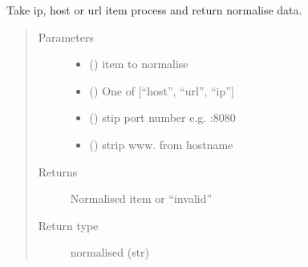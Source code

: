 \documentclass[letterpaper,10pt,english]{sphinxmanual}
\begin{document}

\begin{fulllineitems}
\label{\detokenize{utils:bloxone.utils.normalise}}
\sphinxAtStartPar
Take ip, host or url item process and
return normalise data.
\begin{quote}\begin{description}
\item[{Parameters}] \leavevmode\begin{itemize}
\item {} 
\sphinxAtStartPar
{} () \textendash{} item to normalise

\item {} 
\sphinxAtStartPar
{} () \textendash{} One of {[}“host”, “url”, “ip”{]}

\item {} 
\sphinxAtStartPar
{} () \textendash{} stip port number e.g. :8080

\item {} 
\sphinxAtStartPar
{} () \textendash{} strip www. from hostname

\end{itemize}

\item[{Returns}] \leavevmode
\sphinxAtStartPar
Normalised item or “invalid”

\item[{Return type}] \leavevmode
\sphinxAtStartPar
normalised (str)

\end{description}\end{quote}

\end{fulllineitems}

\end{document}
